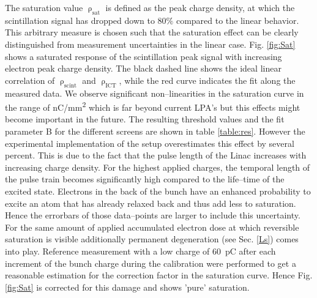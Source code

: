 \documentclass[%
reprint,
amsmath,
amssymb,
aip,
rsi, 
numerical,
floatfix,
]{revtex4-1}
\begin{document}
The saturation value $\uprho_{\text{sat}}$ is defined as the peak charge density, at which the scintillation signal has dropped down to 80$\%$ compared to the linear behavior.
This arbitrary measure is chosen such that the saturation effect can be clearly distinguished from measurement uncertainties in the linear case. 
Fig. \ref{fig:Sat} shows a saturated response of the scintillation peak signal with increasing electron peak charge density. 
The black dashed line shows the ideal linear correlation of $\uprho_{\text{scint}}$ and $\uprho_{\text{ICT}}$, while the red curve indicates the fit along the measured data. 
We observe significant non--linearities in the saturation curve in the range of \si[per-mode=symbol]{\nano\coulomb \per \square\milli\meter} which is far beyond current LPA's but this effects might become important in the future. 
The resulting threshold values and the fit parameter B for the different screens are shown in table \ref{table:res}.
However the experimental implementation of the setup overestimates this effect by several percent. 
This is due to the fact that the pulse length of the Linac increases with increasing charge density.
For the highest applied charges, the temporal length of the pulse train becomes significantly high compared to the life--time of the excited state.
Electrons in the back of the bunch have an enhanced probability to excite an atom that has already relaxed back and thus add less to saturation.
Hence the errorbars of those data--points are larger to include this uncertainty.
For the same amount of applied accumulated electron dose at which reversible saturation is visible additionally permanent degeneration (see Sec. \ref{Ls}) comes into play.
Reference measurement with a low charge of \SI{60}{\pico\coulomb} after each increment of the bunch charge during the calibration were performed to get a reasonable estimation for the correction factor in the saturation curve.
Hence Fig. \ref{fig:Sat} is corrected for this damage and shows 'pure' saturation.      
\end{document}
